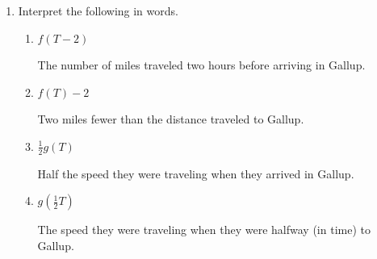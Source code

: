 \documentclass{article}
\begin{document}
\begin{enumerate}
\begin{enumerate}
\begin{enumerate}
      \begin{solution} 
        $\dfrac{ f(12)-f(6)}{6}$        
      \end{solution} 

    \end{enumerate}

  \item Interpret the following in words.

    \begin{enumerate}

    \item 
      \begin{problem}[\vfill]
        $f(T-2)$
      \end{problem}

      \begin{solution}
        The number of miles traveled two hours before arriving in Gallup.   
      \end{solution}

    \item
      \begin{problem}[\vfill]
        $f(T) -2$
      \end{problem}

      \begin{solution}
        Two miles fewer than the distance traveled to Gallup.    
      \end{solution}

    \item
      \begin{problem}[\vfill]
        $\frac{1}{2}g(T)$
      \end{problem}

      \begin{solution}
        Half the speed they were traveling when they arrived in Gallup.  
      \end{solution}

    \item
      \begin{problem}[\vfill]
        $g\left(\frac{1}{2}T\right)$
      \end{problem}

      \begin{solution}
        The speed they were traveling when they were halfway (in time) to Gallup. 
      \end{solution}

    \end{enumerate}

  \end{enumerate}


\end{enumerate}
\end{document}
